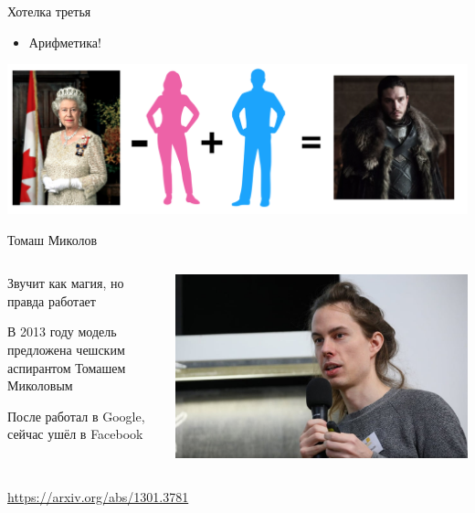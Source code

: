 \documentclass[notes,12pt, aspectratio=169]{beamer}
\newenvironment{wideitemize}{\itemize\addtolength{\itemsep}{10pt}}{\enditemize}
\begin{document}
\begin{frame}{Хотелка третья}
\begin{itemize} 
\item Арифметика! 
\end{itemize} 

\begin{center}
\includegraphics[width=.8\linewidth]{w2v_arith.png}
\end{center}
\end{frame} 


\begin{frame}{Томаш Миколов}
		\begin{columns}[T] 
				\begin{column}{.4\textwidth}
						\begin{wideitemize} 
						\item \alert{Звучит как магия, но правда работает}
						
						\item  В 2013 году модель предложена чешским аспирантом  Томашем Миколовым
						
						\item После работал в Google, сейчас ушёл в Facebook  
						\end{wideitemize} 
				\end{column}%
				\hfill%
				\begin{column}{.6\textwidth}
						\begin{center}
						\includegraphics[width=.99\linewidth]{tomas-mikolov.jpg}
						\end{center}
				\end{column}%
		\end{columns}
		\vfill
		\footnotesize  {\color{blue} \url{https://arxiv.org/abs/1301.3781}}
\end{frame}
\end{document}
